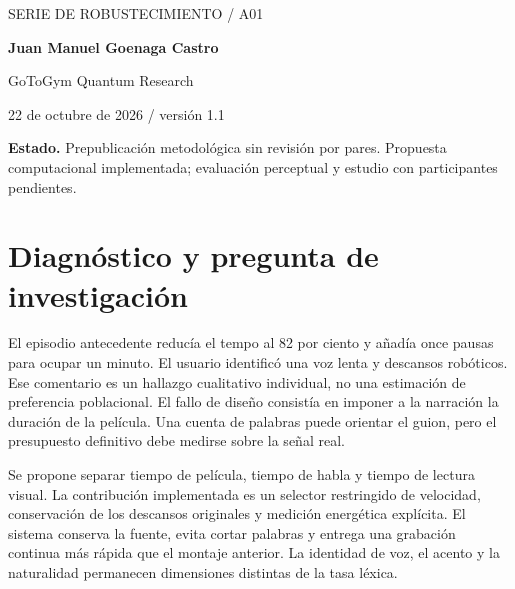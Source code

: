 \documentclass[10pt,a4paper]{article}
\begin{document}
\begin{center}{\sffamily\small\textcolor{mint}{SERIE DE ROBUSTECIMIENTO / A01}}\par\vspace{10pt}{\sffamily\LARGE\bfseries\textcolor{ink}{Prosodia continua y ritmo narrativo}}\par\vspace{7pt}{\large Control temporal QAF sin silencios de relleno}\par\vspace{12pt}\textbf{Juan Manuel Goenaga Castro}\par GoToGym Quantum Research\par 22 de octubre de 2026 / versión 1.1\end{center}\colorbox{ink!6}{\parbox{.96\linewidth}{\small\textbf{Estado.} Prepublicación metodológica sin revisión por pares. Propuesta computacional implementada; evaluación perceptual y estudio con participantes pendientes.}}\begin{abstract}Se propone separar tiempo de película, tiempo de habla y tiempo de lectura visual. La contribución implementada es un selector restringido de velocidad, conservación de los descansos originales y medición energética explícita. El sistema conserva la fuente, evita cortar palabras y entrega una grabación continua más rápida que el montaje anterior. La identidad de voz, el acento y la naturalidad permanecen dimensiones distintas de la tasa léxica. Se presenta el problema observado, una formalización con unidades y restricciones, el código correspondiente y sus controles. Se distingue la verificación de ingeniería de calidad percibida, identidad regional y efecto comercial. El uso QAF corresponde a la región clásica identificable y conserva un comparador con los mismos recursos.\end{abstract}
\section{Diagnóstico y pregunta de investigación}
El episodio antecedente reducía el tempo al 82 por ciento y añadía once pausas para ocupar un minuto. El usuario identificó una voz lenta y descansos robóticos. Ese comentario es un hallazgo cualitativo individual, no una estimación de preferencia poblacional. El fallo de diseño consistía en imponer a la narración la duración de la película. Una cuenta de palabras puede orientar el guion, pero el presupuesto definitivo debe medirse sobre la señal real.

Se propone separar tiempo de película, tiempo de habla y tiempo de lectura visual. La contribución implementada es un selector restringido de velocidad, conservación de los descansos originales y medición energética explícita. El sistema conserva la fuente, evita cortar palabras y entrega una grabación continua más rápida que el montaje anterior. La identidad de voz, el acento y la naturalidad permanecen dimensiones distintas de la tasa léxica.
\end{document}
